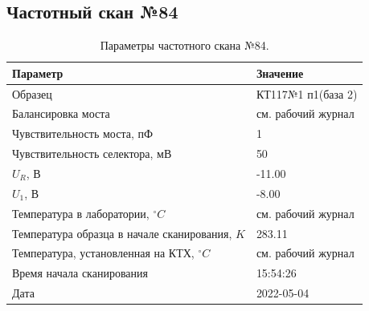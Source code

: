 \subsection{Частотный скан №84}
\begin{table}[!ht]
    \centering
    \caption{Параметры частотного скана №84.}
    \begin{tabular}{|l|l|}
        \hline
        Параметр                                       & Значение                  \\ \hline
        Образец                                        & КТ117№1 п1(база 2)        \\ \hline
        Балансировка моста                             & см. рабочий журнал        \\ \hline
        Чувствительность моста, пФ                     & 1                         \\ \hline
        Чувствительность селектора, мВ                 & 50                        \\ \hline
        $U_R$, В                                       & -11.00                    \\ \hline
        $U_1$, В                                       & -8.00                     \\ \hline
        Температура в лаборатории, $^\circ C$          & см. рабочий журнал        \\ \hline
        Температура образца в начале сканирования, $K$ & 283.11                    \\ \hline
        Температура, установленная на КТХ, $^\circ C$  & см. рабочий журнал        \\ \hline
        Время начала сканирования                      & 15:54:26                  \\ \hline
        Дата                                           & 2022-05-04                \\ \hline
    \end{tabular}
    \label{table:frequency_scan_84}
\end{table}

